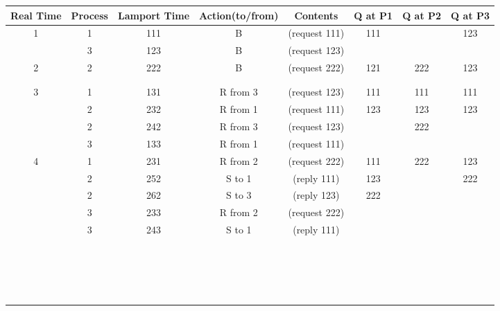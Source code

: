 \documentclass{article}
\begin{document}
\begin{enumerate}
\begin{changemargin}{-0.5in}{0.5in} 
\begin{tabular}{|c|c|c|c|c|c|c|c|}
\hline
Real Time & Process & Lamport Time & Action(to/from) & Contents & Q at P1 & Q at P2 & Q at P3 \\
\hline
1 & 1 & 111 & B & (request 111) & 111 & & 123 \\
 & 3 & 123 & B & (request 123) & & & \\
\hline
 2 & 2 & 222 & B & (request 222) & 121 & 222 & 123 \\
  & & & & & & & \\
  & & & & & & & \\
\hline
  3 & 1 & 131 & R from 3 & (request 123) & 111 & 111 & 111 \\
  & 2 & 232 & R from 1 & (request 111) & 123 & 123 & 123 \\
  & 2 & 242 & R from 3 & (request 123) & & 222 & \\
  & 3 & 133 & R from 1 & (request 111) & & & \\
\hline
  4 & 1 & 231 & R from 2 & (request 222) & 111 & 222 & 123 \\
  & 2 & 252 & S to 1 & (reply 111) & 123 &  & 222 \\
  & 2 & 262 & S to 3 & (reply 123) & 222 & & \\
  & 3 & 233 & R from 2 & (request 222) & &  &  \\
  & 3 & 243 & S to 1 & (reply 111) & & & \\
\hline
  & & & & & & &\\
  & & & & & & &\\
  & & & & & & &\\
\hline
  & & & & & & &\\
  & & & & & & &\\
  & & & & & & &\\
\hline
 & & & & & & &\\
  & & & & & & &\\
  & & & & & & &\\
\hline
  & & & & & & &\\
  & & & & & & &\\
  & & & & & & &\\
\hline
  & & & & & & &\\
  & & & & & & &\\
  & & & & & & &\\
\hline
  & & & & & & &\\
  & & & & & & &\\
  & & & & & & &\\

\end{tabular}
\end{changemargin}
\end{enumerate}
\end{document}
